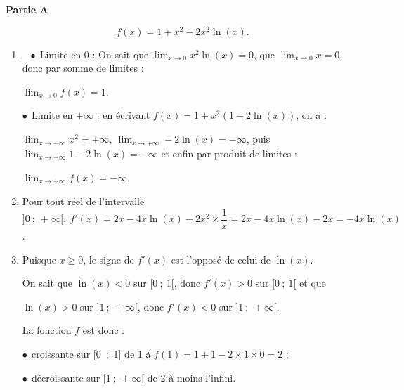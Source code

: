 
\medskip

\textbf{Partie A}

\medskip


\[f(x) = 1 + x^2 - 2x^2\ln (x).\]


\medskip

\begin{enumerate}
\item ~%
$\bullet~~$Limite en 0 : On sait que $\displaystyle\lim_{x \to 0} x^2\ln (x) = 0$, que $\displaystyle\lim_{x \to 0} x = 0$, donc par somme de limites :

$\displaystyle\lim_{x \to 0} f(x) = 1$.

$\bullet~~$Limite en $+ \infty$ : en écrivant $f(x) = 1 + x^2(1 - 2\ln (x))$, on a :

$\displaystyle\lim_{x \to + \infty}x^2 = + \infty, \:\displaystyle\lim_{x \to + \infty} - 2\ln (x) = - \infty$, puis $\displaystyle\lim_{x \to + \infty}1 - 2\ln (x) = - \infty$ et enfin par produit de limites :

$\displaystyle\lim_{x \to + \infty}f(x) = - \infty$.
\item %

Pour tout réel de l'intervalle $]0~;~+ \infty[, \: f'(x) = 2x - 4x\ln (x) - 2x^2 \times \dfrac1x = 2x - 4x\ln (x) - 2x = - 4x\ln (x)$.
\item %
Puisque $x \geqslant 0$, le signe de $f'(x)$ est l'opposé de celui de $\ln (x)$.

On sait que $\ln (x) < 0$ sur $[0~;~1[$, donc $f'(x) > 0$ sur $[0~;~1[$ et que 

$\ln (x) > 0$ sur $]1~;~+ \infty[$, donc $f'(x) < 0$ sur $]1~;~+ \infty[$.

La fonction $f$ est donc :

$\bullet~~$croissante sur [0~;~1] de 1 à $f(1) = 1 + 1 - 2 \times 1 \times 0 = 2$ ;

$\bullet~~$décroissante sur $[1~;~+\infty[$ de 2 à moins l'infini.


\end{enumerate}
